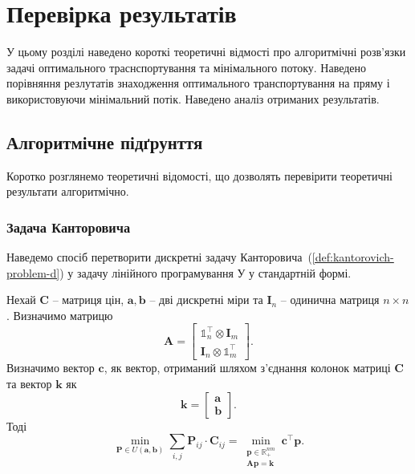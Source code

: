 \chapter{Перевірка результатів}
\label{chap:experiment}

У цьому розділі наведено короткі теоретичні відмості про алгоритмічні розв'язки задачі оптимального траснспортування та 
мінімального потоку. Наведено порівняння резлутатів знаходження оптимального транспортування на пряму і використовуючи мінімальний
потік. Наведено аналіз отриманих результатів.

\section{Алгоритмічне підґрунття}
Коротко розглянемо теоретичні відомості, що дозволять перевірити теоретичні результати алгоритмічно.

\subsection{Задача Канторовича}
Наведемо спосіб перетворити дискретні задачу Канторовича~(\ref{def:kantorovich-problem-d}) у задачу лінійного програмування У
у стандартній формі.

\begin{claim}
    Нехай $\mathbf{C}$ -- матриця цін, $\mathbf{a}, \mathbf{b}$ -- дві дискретні міри
    та $\mathbf{I}_n$ -- одинична матриця $n \times n$. Визначимо матрицю
    $$
    \mathbf{A} = 
    \begin{bmatrix}
    \mathbb{1}_n^\top \otimes \mathbf{I}_m \\
    \mathbf{I}_n \otimes \mathbb{1}_m^\top
    \end{bmatrix}.
    $$
    Визначимо вектор $\mathbf{c}$, як вектор, отриманий шляхом з'єднання колонок матриці $\mathbf{C}$ та вектор $\mathbf{k}$ як
    $$ \mathbf{k} =
        \begin{bmatrix}
            \mathbf{a} \\
            \mathbf{b}
        \end{bmatrix}.
    $$
    Тоді
    \begin{equation}
        \label{eq:kantorovich-linear}
        \min_{\mathbf{P} \in U\left(\mathbf{a}, \mathbf{b}\right)} \sum_{i,j} \mathbf{P}_{ij} \cdot \mathbf{C}_{ij} =
        \min_{\substack{
            \mathbf{p} \in \mathbb{R}_+^{nm} \\
            \mathbf{A}\mathbf{p} = \mathbf{k}
        }}
        \mathbf{c}^\top \mathbf{p}.
    \end{equation}
\end{claim}

